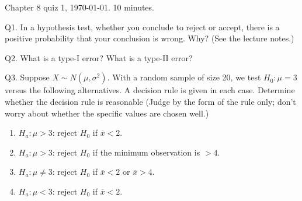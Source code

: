 \documentclass[12pt]{article}
\begin{document}
\thispagestyle{empty}

Chapter 8 quiz 1, \today. 10 minutes.
\bigskip

Q1.
In a hypothesis test,
whether you conclude to reject or accept,
there is a positive probability that your conclusion is wrong.
Why? (See the lecture notes.)

\vskip2in

Q2.
What is a type-I error? What is a type-II error?

\vskip3in

Q3.
Suppose $X\sim N(\mu, \sigma^2)$.
With a random sample of size 20,
we test $H_0: \mu = 3$ versus the following alternatives.
A decision rule is given in each case.
Determine whether the decision rule is reasonable
(Judge by the form of the rule only; don't worry about whether the
specific values are chosen well.)
\begin{enumerate}
\item $H_a: \mu > 3$: reject $H_0$ if $\overline{x} < 2$.
\item $H_a: \mu > 3$: reject $H_0$ if the minimum observation is $> 4$.
\item $H_a: \mu\ne 3$: reject $H_0$ if $\overline{x} < 2$ or
    $\overline{x} > 4$.
\item $H_a: \mu < 3$: reject $H_0$ if $\overline{x} < 2$.
\end{enumerate}
\end{document}
